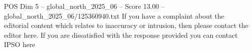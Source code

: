 \begin{textsample}{POS Dim 5 – global\_north\_2025\_06 – Score 13.00 – global\_north\_2025\_06/125360940.txt}
If you have a complaint about the editorial content which relates to inaccuracy or intrusion, then please contact the editor here.
If you are dissatisfied with the response provided you can contact IPSO here

\end{textsample}
